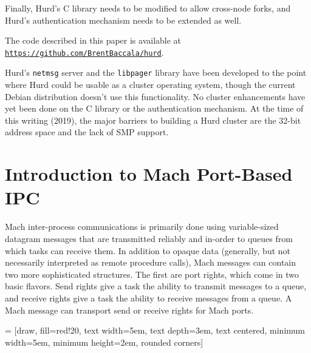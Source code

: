 \documentclass{article}
\def\libpager{{\tt libpager}\xspace}
\def\netmsg{{\tt netmsg}\xspace}
\begin{document}
Finally, Hurd's C library needs to be modified to allow cross-node
forks, and Hurd's authentication mechanism needs to be extended
as well.

The code described in this paper is available at
\href{https://github.com/BrentBaccala/hurd}{\tt https://github.com/BrentBaccala/hurd}.

Hurd's \netmsg server and the \libpager library have been developed
to the point where Hurd could be usable as a cluster operating system,
though the current Debian distribution doesn't use this functionality.
No cluster enhancements have yet been done on the C library or the authentication mechanism.
At the time of this writing (2019), the major barriers to building a
Hurd cluster are the 32-bit address space and the lack of SMP support.

\vfill\eject
\section{Introduction to Mach Port-Based IPC}

Mach inter-process communications is primarily done using
variable-sized datagram messages that are transmitted reliably and
in-order to queues from which tasks can receive them.  In addition to
opaque data (generally, but not necessarily interpreted as remote
procedure calls), Mach messages can contain two more sophisticated
structures.  The first are port rights, which come in two basic
flavors.  Send rights give a task the ability to transmit messages to
a queue, and receive rights give a task the ability to receive
messages from a queue.  A Mach message can transport send or receive
rights for Mach ports.

 = [draw, fill=red!20, text width=5em, text depth=3em, text centered,
  minimum width=5em, minimum height=2em, rounded corners]
\end{document}

